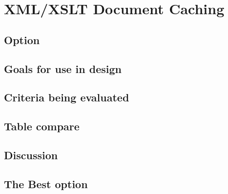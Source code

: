 \section{XML/XSLT Document Caching}

\subsection{Option}

\subsection{Goals for use in design}

\subsection{Criteria being evaluated}

\subsection{Table compare}
%	
%	


\subsection{Discussion}

\subsection{The Best option}
